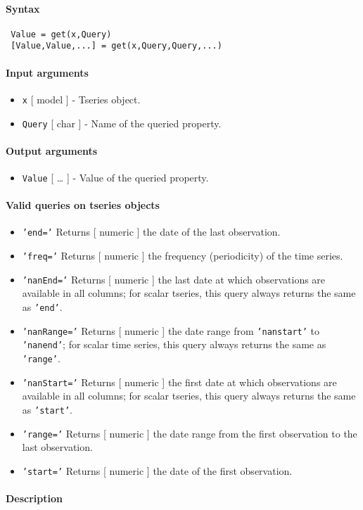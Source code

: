 


	\paragraph{Syntax}
 
 \begin{verbatim}
 Value = get(x,Query)
 [Value,Value,...] = get(x,Query,Query,...)
 \end{verbatim}
 
 \paragraph{Input arguments}
 
 \begin{itemize}
 \item
   \texttt{x} {[} model {]} - Tseries object.
 \item
   \texttt{Query} {[} char {]} - Name of the queried property.
 \end{itemize}
 
 \paragraph{Output arguments}
 
 \begin{itemize}
 \item
   \texttt{Value} {[} \ldots{} {]} - Value of the queried property.
 \end{itemize}
 
 \paragraph{Valid queries on tseries objects}
 
 \begin{itemize}
 \item
   \texttt{'end='} Returns {[} numeric {]} the date of the last
   observation.
 \item
   \texttt{'freq='} Returns {[} numeric {]} the frequency (periodicity)
   of the time series.
 \item
   \texttt{'nanEnd='} Returns {[} numeric {]} the last date at which
   observations are available in all columns; for scalar tseries, this
   query always returns the same as \texttt{'end'}.
 \item
   \texttt{'nanRange='} Returns {[} numeric {]} the date range from
   \texttt{'nanstart'} to \texttt{'nanend'}; for scalar time series, this
   query always returns the same as \texttt{'range'}.
 \item
   \texttt{'nanStart='} Returns {[} numeric {]} the first date at which
   observations are available in all columns; for scalar tseries, this
   query always returns the same as \texttt{'start'}.
 \item
   \texttt{'range='} Returns {[} numeric {]} the date range from the
   first observation to the last observation.
 \item
   \texttt{'start='} Returns {[} numeric {]} the date of the first
   observation.
 \end{itemize}
 
 \paragraph{Description}


